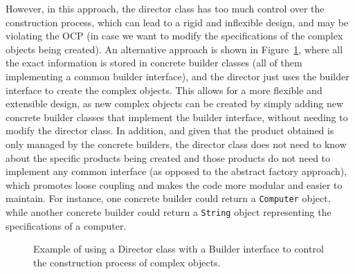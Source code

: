However, in this approach, the director class has too much control over the construction process, which can lead to a rigid and inflexible design, and may be violating the OCP (in case we want to modify the specifications of the complex objects being created). An alternative approach is shown in Figure~\ref{fig:builder-director-2}, where all the exact information is stored in concrete builder classes (all of them implementing a common builder interface), and the director just uses the builder interface to create the complex objects. 
This allows for a more flexible and extensible design, as new complex objects can be created by simply adding new concrete builder classes that implement the builder interface, without needing to modify the director class. In addition, and given that the product obtained is only managed by the concrete builders, the director class does not need to know about the specific products being created and those products do not need to implement any common interface (as opposed to the abstract factory approach), which promotes loose coupling and makes the code more modular and easier to maintain. For instance, one concrete builder could return a \texttt{Computer} object, while another concrete builder could return a \texttt{String} object representing the specifications of a computer.
\begin{figure}
    \centering
    \caption{Example of using a Director class with a Builder interface to control the construction process of complex objects.}
    \label{fig:builder-director-2}
\end{figure}


